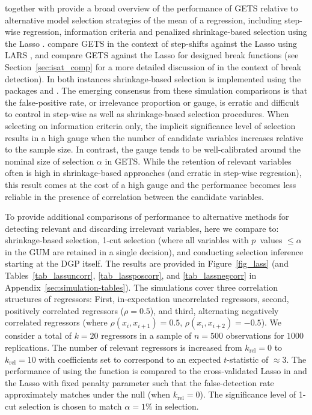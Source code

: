 \documentclass[article,nojss]{jss}
\begin{document}
\citet[Section 17]{HendryDoornik2014} together with
\cite{castle2011evaluating} provide a broad overview of the
performance of GETS relative to alternative model selection strategies
of the mean of a regression, including step-wise regression,
information criteria and penalized shrinkage-based selection using the
Lasso
\citep[see][]{tibshirani1996regression}. \cite{castle2015detecting}
compare GETS in the context of step-shifts against the Lasso using
LARS \citep{efron2004least}, and \cite{pretis_volc16} compare GETS
against the Lasso for designed break functions (see
Section~\ref{sec:isat_comp} for a more detailed discussion of
 in the context of break detection). In both instances
shrinkage-based selection is implemented using the 
packages  \citep{HastieEfron2013} and 
\citep{friedman2010regularization}.  The emerging consensus from these
simulation comparisons is that the false-positive rate, or irrelevance
proportion or gauge, is erratic and difficult to control in step-wise
as well as shrinkage-based selection procedures. When selecting on
information criteria only, the implicit significance level of
selection results in a high gauge when the number of candidate
variables increases relative to the sample size. In contrast, the
gauge tends to be well-calibrated around the nominal size of selection
$\alpha$ in GETS.  While the retention of relevant variables often is
high in shrinkage-based approaches (and erratic in step-wise
regression), this result comes at the cost of a high gauge and the
performance becomes less reliable in the presence of correlation
between the candidate variables.

To provide additional comparisons of performance to alternative
methods for detecting relevant and discarding irrelevant variables,
here we compare  to: shrinkage-based selection, 1-cut
selection (where all variables with $p$~values $\leq \alpha$ in the GUM
are retained in a single decision), and conducting selection inference
starting at the DGP itself. The results are provided in
Figure~\ref{fig_lass} (and Tables~\ref{tab_lassuncorr},
\ref{tab_lassposcorr}, and \ref{tab_lassnegcorr} in Appendix~\ref{sec:simulation-tables}). The
simulations cover three correlation structures of regressors: First,
in-expectation uncorrelated regressors, second, positively correlated
regressors ($\rho=0.5$), and third, alternating negatively correlated
regressors (where $\rho(x_i, x_{i+1}) = 0.5$,
$\rho(x_i, x_{i+2})=-0.5$). We consider a total of $k=20$ regressors
in a sample of $n=500$ observations for $1000$ replications. The
number of relevant regressors is increased from $k_{\text{rel}}=0$ to
$k_{\text{rel}}=10$ with coefficients set to correspond to an expected
$t$-statistic of $\approx 3$. The performance of  using the
 function is compared to the cross-validated Lasso in
 and the Lasso with fixed penalty parameter such that the
false-detection rate approximately matches  under the null
(when $k_{\text{rel}}=0$). The significance level of 1-cut selection
is chosen to match $\alpha=1\%$ in  selection.
\end{document}
